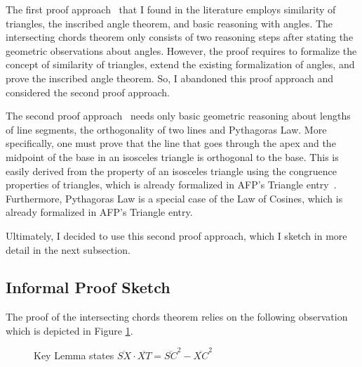 \documentclass[11pt,a4paper]{article}
\newcommand{\length}[1]{\overline{#1}}
\begin{document}
The first proof approach~\cite{proofwiki:chord-theorem} that I found in the
literature employs similarity of triangles, the inscribed angle theorem,
and basic reasoning with angles.
The intersecting chords theorem only consists of two reasoning steps after
stating the geometric observations about angles.
However, the proof requires to formalize the concept of similarity of triangles,
extend the existing formalization of angles, and prove the inscribed angle theorem.
So, I abandoned this proof approach and considered the second proof
approach.

The second proof approach~\cite{proofwiki:chord-theorem} needs only
basic geometric reasoning about lengths of line segments, the orthogonality
of two lines and Pythagoras Law.
More specifically, one must prove that the line that goes through
the apex and the midpoint of the base in an isosceles triangle
is orthogonal to the base. This is easily derived from the property
of an isosceles triangle using the congruence properties of triangles,
which is already formalized in AFP's Triangle entry~\cite{Triangle-AFP}.
Furthermore, Pythagoras Law is a special case of the
Law of Cosines, which is already formalized in AFP's Triangle entry.

Ultimately, I decided to use this second proof approach, which I
sketch in more detail in the next subsection.

\subsection{Informal Proof Sketch}

The proof of the intersecting chords theorem relies on the following observation
which is depicted in Figure \ref{fig:chord-property}.

\begin{figure}
\caption{Key Lemma states $\length{SX} \cdot \length{XT} = \length{SC} ^ 2 - \length{XC} ^ 2$}
\label{fig:chord-property}
\end{figure}
\end{document}

